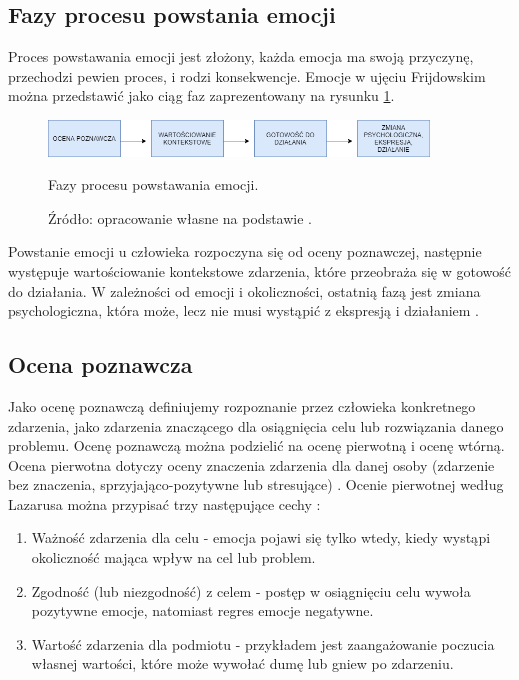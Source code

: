 \subsection{Fazy procesu powstania emocji}
Proces powstawania emocji jest złożony, każda emocja ma swoją przyczynę, przechodzi pewien proces, i rodzi konsekwencje. Emocje w ujęciu Frijdowskim można przedstawić jako ciąg faz zaprezentowany na rysunku \ref{fig:fazes}.

\begin{figure}[h]
	\centering
	\includegraphics[width=0.9\textwidth]{images/diagram.png}
	\caption{Fazy procesu powstawania emocji.}
	\caption*{Źródło: opracowanie własne na podstawie \citep[s.98]{oatly}.}
	\label{fig:fazes}
\end{figure}

Powstanie emocji u człowieka rozpoczyna się od oceny poznawczej, następnie występuje wartościowanie kontekstowe zdarzenia, które przeobraża się w gotowość do działania. W zależności od emocji i okoliczności, ostatnią fazą jest zmiana psychologiczna, która może, lecz nie musi wystąpić z ekspresją i działaniem \citep{oatly}.

\subsection{Ocena poznawcza}
Jako ocenę poznawczą definiujemy rozpoznanie przez człowieka konkretnego zdarzenia, jako zdarzenia znaczącego dla osiągnięcia celu lub rozwiązania danego problemu. Ocenę poznawczą można podzielić na ocenę pierwotną i ocenę wtórną. Ocena pierwotna dotyczy oceny znaczenia zdarzenia dla danej osoby (zdarzenie bez znaczenia, sprzyjająco-pozytywne lub stresujące) \citep{oatly, website:teoriastresu}. Ocenie pierwotnej według Lazarusa  można przypisać trzy następujące cechy \citep{oatly}:

\begin{enumerate}
\item Ważność zdarzenia dla celu - emocja pojawi się tylko wtedy, kiedy wystąpi okoliczność mająca wpływ na cel lub problem.
\item Zgodność (lub niezgodność) z celem - postęp w osiągnięciu celu wywoła pozytywne emocje, natomiast regres emocje negatywne.
\item Wartość zdarzenia dla podmiotu - przykładem jest zaangażowanie poczucia własnej wartości, które może wywołać dumę lub gniew po zdarzeniu.
\end{enumerate}

